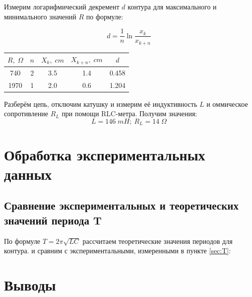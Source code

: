 \documentclass{article}
\begin{document}
Измерим логарифмический декремент \(d\) контура для максимального и минимального значений \(R\) по формуле:

\[ d = \frac{1}{n}\ln\frac{x_k}{x_{k+n}} \]

\begin{table}[H]
    \centering
    \begin{tabular}{|c|c|c|c|c|}
        \hline
    \(R,\; \Omega\) & \(n\) & \(X_k,\; cm\) & \(X_{k+n},\; cm\) & \(d\) \\\hline
    740  & 2 & 3.5 & 1.4 & 0.458 \\\hline
    1970 & 1 & 2.0 & 0.6 & 1.204 \\\hline
    \end{tabular}
\end{table}

Разберём цепь, отключим катушку и измерим её индуктивность \(L\) и оммическое сопротивление \(R_L\) при помощи
RLC-метра. Получим значения:
\[ L = 146\; mH;\: R_L = 14\;\Omega \]

\section{Обработка экспериментальных данных}
\subsection{Сравнение экспериментальных и теоретических значений периода T}

По формуле \( T = 2\pi\sqrt{LC} \) рассчитаем теоретические значения периодов для контура. и сравним с экспериментальными,
измеренными в пункте \ref{sec:T}:



\section{Выводы}
\end{document}

